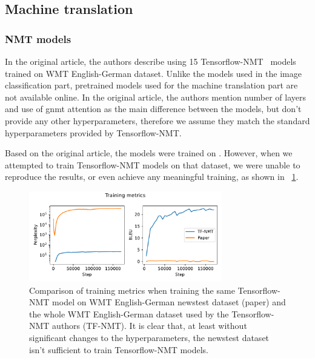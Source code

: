 \begin{figure}
		
\end{figure}

\subsection{Machine translation}

\subsubsection{NMT models} %

In the original article, the authors describe using 15 Tensorflow-NMT~\cite{luong17} models trained on WMT English-German dataset. Unlike the models used in the image classification part, pretrained models used for the machine translation part are not available online. In the original article, the authors mention number of layers and use of gnmt attention as the main difference between the models, but don't provide any other hyperparameters, therefore we assume they match the standard hyperparameters provided by Tensorflow-NMT.

Based on the original article, the models were trained on . However, when we attempted to train Tensorflow-NMT models on that dataset, we were unable to reproduce the results, or even achieve any meaningful training, as shown in \figurename~\ref{fig:tf-nmt_paper_training}.

\begin{figure}[h]
	\centering
	\includegraphics[width=0.75\textwidth]{figures/tf-nmt_paper_training.pdf}
	\caption{Comparison of training metrics when training the same Tensorflow-NMT model on WMT English-German newstest dataset (paper) and the whole WMT English-German dataset used by the Tensorflow-NMT authors (TF-NMT). It is clear that, at least without significant changes to the hyperparameters, the newstest dataset isn't sufficient to train Tensorflow-NMT models.}
	\label{fig:tf-nmt_paper_training}
\end{figure}

